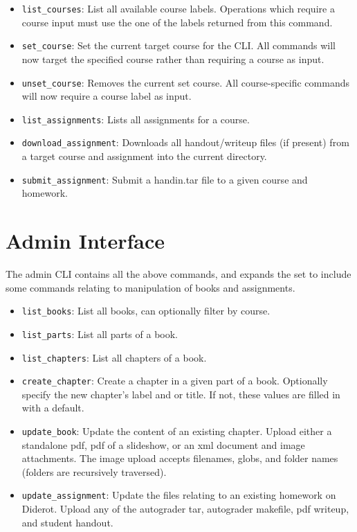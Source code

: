 \begin{itemize}
  \item \verb|list_courses|: List all available course labels.
    Operations which require a course input must use the one of the labels returned from this command.
  \item \verb|set_course|: Set the current target course for the CLI. All commands will now target the  specified course rather than requiring a course as input.
  \item \verb|unset_course|: Removes the current set course. All course-specific commands
    will now require a course label as input.
  \item \verb|list_assignments|: Lists all assignments for a course.
  \item \verb|download_assignment|: Downloads all handout/writeup files (if present) from a
    target course and assignment into the current directory.
  \item \verb|submit_assignment|: Submit a handin.tar file to a given course and homework.
\end{itemize}


\section{Admin Interface}

The admin CLI contains all the above commands, and expands the set to include
some commands relating to manipulation of books and assignments.

\begin{itemize}
  \item \verb|list_books|: List all books, can optionally filter by course.
  \item \verb|list_parts|: List all parts of a book.
  \item \verb|list_chapters|: List all chapters of a book.
  \item \verb|create_chapter|: Create a chapter in a given part of a
    book. Optionally specify the new chapter's label and or title. If
    not, these values are filled in with a default.

  \item \verb|update_book|: Update the content of an existing
    chapter. Upload either a standalone pdf, pdf of a slideshow, or an
    xml document and image attachments.  The image upload accepts
    filenames, globs, and folder names (folders are recursively
    traversed).
  \item \verb|update_assignment|: Update the files relating to an existing homework on Diderot.  Upload any of the autograder tar, autograder makefile, pdf writeup, and student handout.
\end{itemize}



